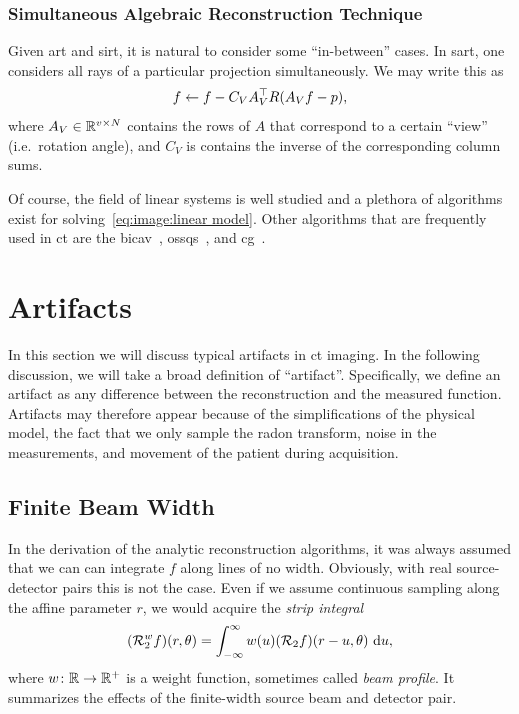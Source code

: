 \documentclass[../ml-ct.tex]{subfiles}
\begin{document}
\subsubsection{Simultaneous Algebraic Reconstruction Technique}
Given \gls{art} and \gls{sirt}, it is natural to consider some \enquote{in-between} cases.
In \gls{sart}, one considers all rays of a particular projection simultaneously.
We may write this as
\begin{equation}
	f \leftarrow f - C_V A_V^\top R (A_V f - p),
\end{equation}
where \( A_V \in \mathbb{R}^{v \times N} \) contains the rows of \( A \) that correspond to a certain \enquote{view} (i.e.\ rotation angle), and \( C_V \) is contains the inverse of the corresponding column sums.

Of course, the field of linear systems is well studied and a plethora of algorithms exist for solving~\cref{eq:image:linear model}.
Other algorithms that are frequently used in \gls{ct} are the \gls{bicav}~\cite{censor_bicav_2001}, \gls{ossqs}~\cite{kamphuis_accelerated_1998,donghwan_accelerated_2011}, and \gls{cg}~\cite{fessler_conjugate_1999,ramani_splitting_2012}.
\section{Artifacts}%
\label{sec:artifacts}
In this section we will discuss typical artifacts in \gls{ct} imaging.
In the following discussion, we will take a broad definition of \enquote{artifact}.
Specifically, we define an artifact as any difference between the reconstruction and the measured function.
Artifacts may therefore appear because of the simplifications of the physical model, the fact that we only sample the radon transform, noise in the measurements, and movement of the patient during acquisition.
\subsection{Finite Beam Width}
In the derivation of the analytic reconstruction algorithms, it was always assumed that we can can integrate \( f \) along lines of no width.
Obviously, with real source-detector pairs this is not the case.
Even if we assume continuous sampling along the affine parameter \( r \), we would acquire the \emph{strip integral}
\begin{equation}
	(\mathcal{R}_2^w f)(r, \theta) = \int_{-\infty}^{\infty} w(u) (\mathcal{R}_2 f)(r - u, \theta)\ \mathrm{d} u,
\end{equation}
where \( w\colon\mathbb{R}\to\mathbb{R}^+ \) is a weight function, sometimes called \emph{beam profile}.
It summarizes the effects of the finite-width source beam and detector pair.
\end{document}
